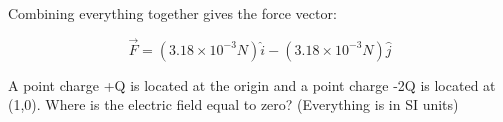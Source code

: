 \begin{solution}
Combining everything together gives the force vector:

\begin{equation*}
    \vec{F} = (3.18 \times 10^{-3} N)\hat{i} - 
              (3.18 \times 10^{-3} N)\hat{j}    
\end{equation*}

\end{solution}


\begin{question}
A point charge +Q is located at the origin and a point charge -2Q is located at (1,0). Where is the electric field equal to zero? (Everything is in SI units)

\end{question}

